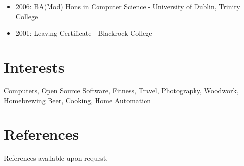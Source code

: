 \documentclass[a4paper, 10pt] {article}
\begin{document}
\begin{itemize}[itemsep=2pt,parsep=2pt]
  \item 2006: BA(Mod) Hons in Computer Science - University of Dublin, Trinity College
  \item 2001: Leaving Certificate - Blackrock College
\end{itemize}

\hrulefill

\section*{Interests}

Computers, Open Source Software, Fitness, Travel, Photography, Woodwork,
Homebrewing Beer, Cooking, Home Automation

\hrulefill

\section*{References}

References available upon request.
\end{document}
